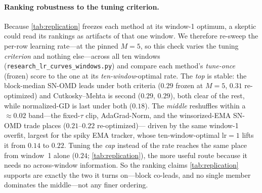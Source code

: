 \documentclass{article}
\begin{document}
\paragraph{Ranking robustness to the tuning criterion.} Because \cref{tab:replication} freezes
each method at its window-1 optimum, a skeptic could read its rankings as artifacts of that one
window. We therefore re-sweep the per-row learning rate---at the pinned $M{=}5$, so this check
varies the tuning \emph{criterion} and nothing else---across all ten windows
(\texttt{research\_lr\_curves\_windows.py}) and compare each method's \emph{tune-once} (frozen)
score to the one at its \emph{ten-window}-optimal rate. The \emph{top} is stable: the
block-median SN-OMD leads under both criteria ($0.29$ frozen at $M{=}5$, $0.31$ re-optimized) and
Cutkosky--Mehta is second ($0.29$, $0.29$), both clear of the rest, while normalized-GD is last
under both ($0.18$). The \emph{middle} reshuffles within a ${\approx}0.02$ band---the fixed-$\tau$
clip, AdaGrad-Norm, and the winsorized-EMA SN-OMD trade places ($0.21$--$0.22$ re-optimized)---%
driven by the same window-1 overfit, largest for the spiky EMA tracker, whose ten-window-optimal
$\mathrm{lr}{=}1$ lifts it from $0.14$ to $0.22$. Tuning the \emph{cap} instead of the rate
reaches the same place from window~1 alone ($0.24$; \cref{tab:replication}), the more useful
route because it needs no across-window information. So the ranking claims \cref{tab:replication}
supports are exactly the two it turns on---block co-leads, and no single member dominates the
middle---not any finer ordering.
\end{document}
